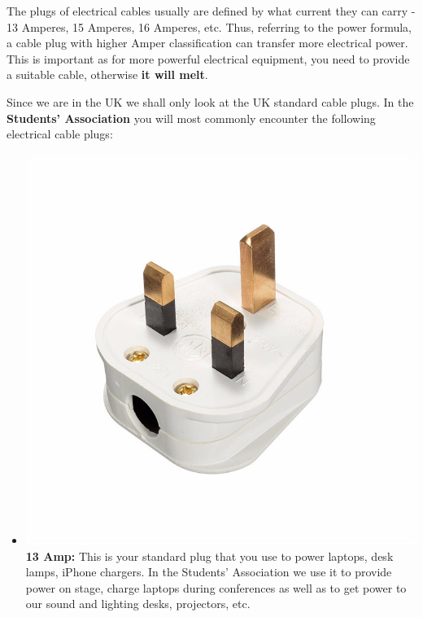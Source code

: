 \documentclass[14pt]{article} %
\begin{document}
The plugs of electrical cables usually are defined by what current they can carry - 13 Amperes, 15 Amperes, 16 Amperes, etc. Thus, referring to the power formula, a cable plug with higher Amper classification can transfer more electrical power. This is important as for more powerful electrical equipment, you need to provide a suitable cable, otherwise \textbf{it will melt}.

Since we are in the UK we shall only look at the UK standard cable plugs. In the \textbf{Students' Association} you will most commonly encounter the following electrical cable plugs:

\begin{itemize}

\item \includegraphics[scale=0.19]{13amp.jpg}\textbf{13 Amp:} This is your standard plug that you use to power laptops, desk lamps, iPhone chargers. In the Students' Association we use it to provide power on stage, charge laptops during conferences as well as to get power to our sound and lighting desks, projectors, etc.  


\end{itemize}
\end{document}
